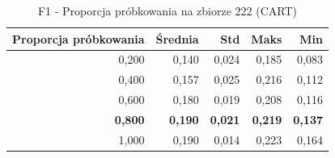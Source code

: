 \begin{table}[htbp]
\centering
\small
\setlength{\tabcolsep}{6pt}
\renewcommand{\arraystretch}{1.2}
\caption{F1 - Proporcja próbkowania na zbiorze 222 (CART)}
\label{tab:CART_sample_ratio_222_f1}
\begin{tabular}{r|r|r|r|r}
\toprule
Proporcja próbkowania & Średnia & Std & Maks & Min \\
\hline
0,200 & 0,140 & 0,024 & 0,185 & 0,083 \\
0,400 & 0,157 & 0,025 & 0,216 & 0,112 \\
0,600 & 0,180 & 0,019 & 0,208 & 0,116 \\
\textbf{0,800} & \textbf{0,190} & \textbf{0,021} & \textbf{0,219} & \textbf{0,137} \\
1,000 & 0,190 & 0,014 & 0,223 & 0,164 \\
\bottomrule
\end{tabular}
\end{table}